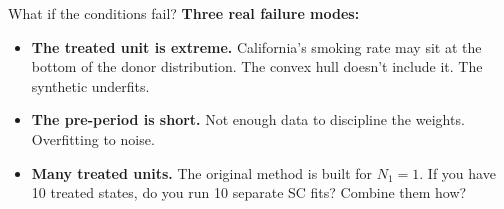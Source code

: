 \documentclass[aspectratio=169,11pt]{beamer}
\begin{document}
\begin{frame}{What if the conditions fail?}
\vspace{0.5em}
\textbf{Three real failure modes:}
\vspace{0.5em}
\begin{itemize}
  \item \textbf{The treated unit is extreme.} \;California's smoking rate may sit at the bottom of the donor distribution. \;The convex hull doesn't include it. \;The synthetic underfits.
  \vspace{0.2em}
  \item \textbf{The pre-period is short.} \;Not enough data to discipline the weights. \;Overfitting to noise.
  \vspace{0.2em}
  \item \textbf{Many treated units.} \;The original method is built for $N_1 = 1$. \;If you have 10 treated states, do you run 10 separate SC fits? Combine them how?
\end{itemize}

\vspace{0.6em}

\vspace{0.5em}
\end{frame}



\end{document}
